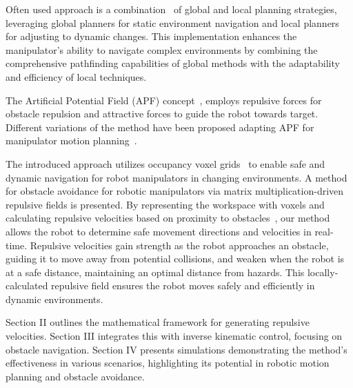 \documentclass[letterpaper, 10 pt, conference]{ieeeconf}  %
\begin{document}
Often used approach is a combination~\cite{a15} of global and local planning strategies, leveraging global planners for static environment navigation and local planners for adjusting to dynamic changes. This implementation enhances the manipulator's ability to navigate complex environments by combining the comprehensive pathfinding capabilities of global methods with the adaptability and efficiency of local techniques.

The Artificial Potential Field (APF) concept~\cite{c33}, employs repulsive forces for obstacle repulsion and attractive forces to guide the robot towards target. Different variations of the method have been proposed adapting APF for manipulator motion planning~\cite{klancar2022robot, c49,park2020trajectory,baumgartner2023potential, c30}.



The introduced approach utilizes occupancy voxel grids~\cite{han2018dynamic} to enable safe and dynamic navigation for robot manipulators in changing environments. A method for obstacle avoidance for robotic manipulators via matrix multiplication-driven repulsive fields is presented. By representing the workspace with voxels and calculating repulsive velocities based on proximity to obstacles~\cite{oleynikova2017voxblox,han2019fiesta,zhou2021egoplanner}, our method allows the robot to determine safe movement directions and velocities in real-time. Repulsive velocities gain strength as the robot approaches an obstacle, guiding it to move away from potential collisions, and weaken when the robot is at a safe distance, maintaining an optimal distance from hazards. This locally-calculated repulsive field ensures the robot moves safely and efficiently in dynamic environments.

Section II outlines the mathematical framework for generating repulsive velocities. Section III integrates this with inverse kinematic control, focusing on obstacle navigation. Section IV presents simulations demonstrating the method's effectiveness in various scenarios, highlighting its potential in robotic motion planning and obstacle avoidance.
\end{document}
